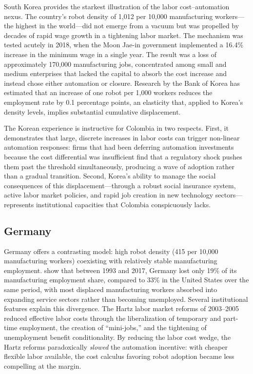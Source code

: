 \documentclass{article}
\begin{document}
South Korea provides the starkest illustration of the labor cost--automation nexus. The country's robot density of 1,012 per 10,000 manufacturing workers---the highest in the world---did not emerge from a vacuum but was propelled by decades of rapid wage growth in a tightening labor market. The mechanism was tested acutely in 2018, when the Moon Jae-in government implemented a 16.4\% increase in the minimum wage in a single year. The result was a loss of approximately 170,000 manufacturing jobs, concentrated among small and medium enterprises that lacked the capital to absorb the cost increase and instead chose either automation or closure. Research by the Bank of Korea has estimated that an increase of one robot per 1,000 workers reduces the employment rate by 0.1 percentage points, an elasticity that, applied to Korea's density levels, implies substantial cumulative displacement.

The Korean experience is instructive for Colombia in two respects. First, it demonstrates that large, discrete increases in labor costs can trigger non-linear automation responses: firms that had been deferring automation investments because the cost differential was insufficient find that a regulatory shock pushes them past the threshold simultaneously, producing a wave of adoption rather than a gradual transition. Second, Korea's ability to manage the social consequences of this displacement---through a robust social insurance system, active labor market policies, and rapid job creation in new technology sectors---represents institutional capacities that Colombia conspicuously lacks.

\subsection{Germany}
\label{subsec:germany}

Germany offers a contrasting model: high robot density (415 per 10,000 manufacturing workers) coexisting with relatively stable manufacturing employment. \cite{dauth2021} show that between 1993 and 2017, Germany lost only 19\% of its manufacturing employment share, compared to 33\% in the United States over the same period, with most displaced manufacturing workers absorbed into expanding service sectors rather than becoming unemployed. Several institutional features explain this divergence. The Hartz labor market reforms of 2003--2005 reduced effective labor costs through the liberalization of temporary and part-time employment, the creation of ``mini-jobs,'' and the tightening of unemployment benefit conditionality. By reducing the labor cost wedge, the Hartz reforms paradoxically \textit{slowed} the automation incentive: with cheaper flexible labor available, the cost calculus favoring robot adoption became less compelling at the margin.
\end{document}
